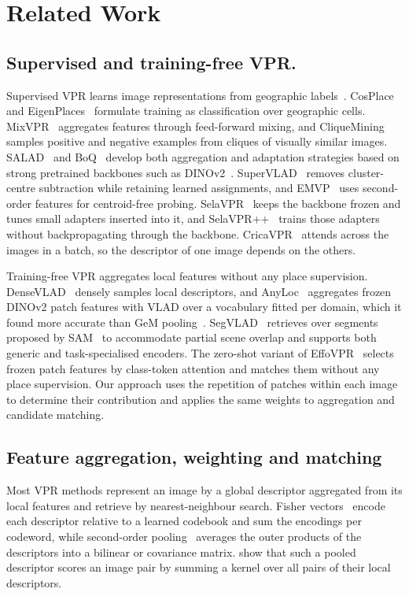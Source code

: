 \section{Related Work}
\label{sec:related}

\subsection{Supervised and training-free VPR.}
Supervised VPR learns image representations from geographic labels~\citep{netvlad}. CosPlace and EigenPlaces~\citep{cosplace,eigenplaces} formulate training as classification over geographic cells. MixVPR~\citep{mixvpr} aggregates features through feed-forward mixing, and CliqueMining~\citep{cliquemining} samples positive and negative examples from cliques of visually similar images. 
SALAD~\citep{salad} and BoQ~\citep{boq} develop both aggregation and adaptation strategies based on strong pretrained backbones such as DINOv2~\citep{dinov2}. SuperVLAD~\citep{supervlad} removes cluster-centre subtraction while retaining learned assignments, and EMVP~\citep{emvp} uses second-order features for centroid-free probing. SelaVPR~\citep{selavpr} keeps the backbone frozen and tunes small adapters inserted into it, and SelaVPR++~\citep{selavprpp} trains those adapters without backpropagating through the backbone. CricaVPR~\citep{cricavpr} attends across the images in a batch, so the descriptor of one image depends on the others.

Training-free VPR aggregates local features without any place supervision. DenseVLAD~\citep{densevlad} densely samples local descriptors, and AnyLoc~\citep{anyloc} aggregates frozen DINOv2 patch features with VLAD over a vocabulary fitted per domain, which it found more accurate than GeM pooling~\citep{gem}. SegVLAD~\citep{segvlad} retrieves over segments proposed by SAM~\citep{kirillov2023segment} to accommodate partial scene overlap and supports both generic and task-specialised encoders. The zero-shot variant of EffoVPR~\citep{effovpr} selects frozen patch features by class-token attention and matches them without any place supervision. 
Our approach uses the repetition of patches within each image to determine their contribution and applies the same weights to aggregation and candidate matching.

\subsection{Feature aggregation, weighting and matching} 
Most VPR methods represent an image by a global descriptor aggregated from its local features and retrieve by nearest-neighbour search. 
Fisher vectors~\citep{fisherkernel,improvedfisher} encode each descriptor relative to a learned codebook and sum the encodings per codeword, while second-order pooling~\citep{bcnn,mpncov} averages the outer products of the descriptors into a bilinear or covariance matrix. 
\citet{emk} show that such a pooled descriptor scores an image pair by summing a kernel over all pairs of their local descriptors.  


